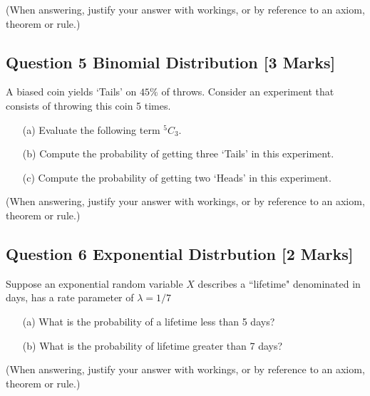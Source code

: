 \noindent (When answering, justify your answer with workings, or by reference to an
axiom, theorem or rule.)

\newpage

\subsection*{Question 5 Binomial Distribution [3 Marks] } %
A biased coin yields `Tails' on $45\%$ of throws. Consider an experiment that consists of throwing this coin 5 times.
\begin{itemize}
\item[(a)]  Evaluate the following term $^{5}C_3$.
\item[(b)]  Compute the probability of getting three `Tails' in this experiment.
\item[(c)]  Compute the probability of getting two `Heads' in this experiment.
\end{itemize}

\noindent(When answering, justify your answer with workings, or by reference to an
axiom, theorem or rule.)

\bigskip






\subsection*{Question 6 Exponential Distrbution [2 Marks]}

Suppose an exponential random variable $X$ describes a ``lifetime" denominated in days, has a rate parameter of $\lambda = 1/7$
\begin{itemize}
\item[(a)]  What is the probability of a lifetime less than 5 days?
\item[(b)]  What is the probability of lifetime greater than 7 days?
\end{itemize}


\noindent(When answering, justify your answer with workings, or by reference to an
axiom, theorem or rule.)
\bigskip










